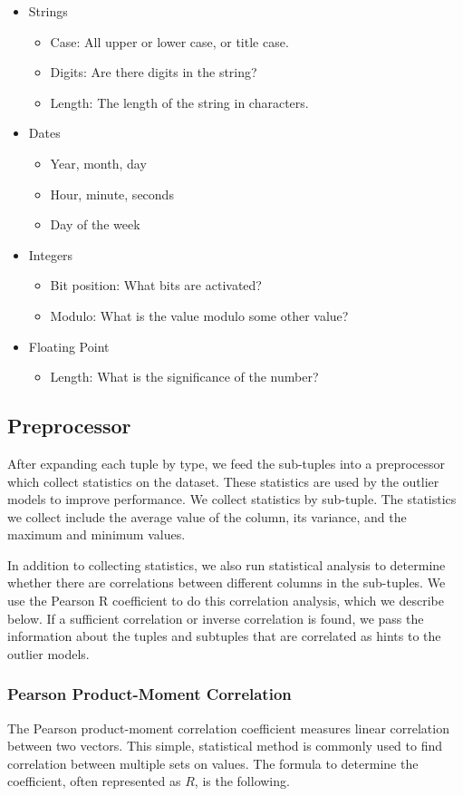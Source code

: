 \documentclass{vldb}
\begin{document}
\begin{itemize}
\item Strings
\begin{itemize}
\item Case: All upper or lower case, or title case.
\item Digits: Are there digits in the string?
\item Length: The length of the string in characters.
\end{itemize}
\item Dates
\begin{itemize}
\item Year, month, day
\item Hour, minute, seconds
\item Day of the week
\end{itemize}
\item Integers
\begin{itemize}
\item Bit position: What bits are activated?
\item Modulo: What is the value modulo some other value?
\end{itemize}
\item Floating Point
\begin{itemize}
\item Length: What is the significance of the number?
\end{itemize}
\end{itemize}

\subsection{Preprocessor}
After expanding each tuple by type, we feed the sub-tuples into a preprocessor which collect statistics on the dataset.
These statistics are used by the outlier models to improve performance.
We collect statistics by sub-tuple.
The statistics we collect include the average value of the column, its variance, and the maximum and minimum values. 

In addition to collecting statistics, we also run statistical analysis to determine whether there are correlations between different columns in the sub-tuples.
We use the Pearson R coefficient to do this correlation analysis, which we describe below.
If a sufficient correlation or inverse correlation is found, we pass the information about the tuples and subtuples that are correlated as hints to the outlier models.

\subsubsection{Pearson Product-Moment Correlation}
The Pearson product-moment correlation coefficient measures linear correlation between two vectors.
This simple, statistical method is commonly used to find correlation between multiple sets on values.
The formula to determine the coefficient, often represented as $R$, is the following.
\end{document}
